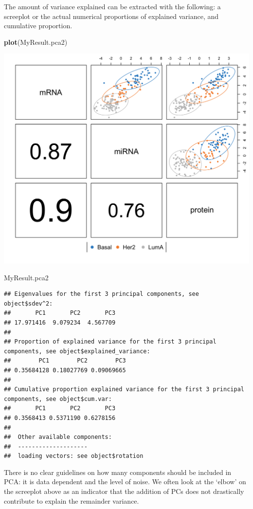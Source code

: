 \documentclass[]{book}
\newenvironment{Shaded}{\begin{snugshade}}{\end{snugshade}}
\newcommand{\KeywordTok}[1]{\textcolor[rgb]{0.13,0.29,0.53}{\textbf{#1}}}
\newcommand{\NormalTok}[1]{#1}
\theoremstyle{definition}
\theoremstyle{definition}
\theoremstyle{definition}
\theoremstyle{remark}
\begin{document}
The amount of variance explained can be extracted with the following: a
screeplot or the actual numerical proportions of explained variance, and
cumulative proportion.

\begin{Shaded}
\begin{Highlighting}[]
\KeywordTok{plot}\NormalTok{(MyResult.pca2)}
\end{Highlighting}
\end{Shaded}

\begin{center}\includegraphics[width=0.5\linewidth]{Figures/unnamed-chunk-6-1} \end{center}

\begin{Shaded}
\begin{Highlighting}[]
\NormalTok{MyResult.pca2}
\end{Highlighting}
\end{Shaded}

\begin{verbatim}
## Eigenvalues for the first 3 principal components, see object$sdev^2: 
##       PC1       PC2       PC3 
## 17.971416  9.079234  4.567709 
## 
## Proportion of explained variance for the first 3 principal components, see object$explained_variance: 
##        PC1        PC2        PC3 
## 0.35684128 0.18027769 0.09069665 
## 
## Cumulative proportion explained variance for the first 3 principal components, see object$cum.var: 
##       PC1       PC2       PC3 
## 0.3568413 0.5371190 0.6278156 
## 
##  Other available components: 
##  -------------------- 
##  loading vectors: see object$rotation
\end{verbatim}

There is no clear guidelines on how many components should be included
in PCA: it is data dependent and the level of noise. We often look at
the `elbow' on the screeplot above as an indicator that the addition of
PCs does not drastically contribute to explain the remainder variance.
\end{document}
